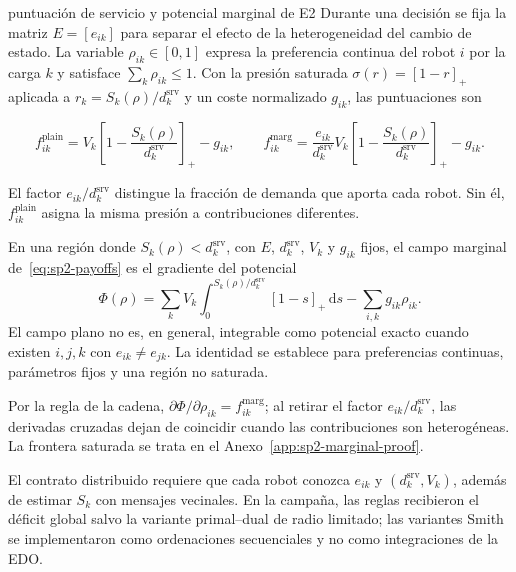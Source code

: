 \begin{contribucion}{puntuación de servicio y potencial marginal de E2}
Durante una decisión se fija la matriz $E=[e_{ik}]$ para separar el efecto de la heterogeneidad del cambio de estado. La variable $\rho_{ik}\in[0,1]$ expresa la preferencia continua del robot $i$ por la carga $k$ y satisface $\sum_k\rho_{ik}\leq1$. Con la presión saturada $\sigma(r)=[1-r]_+$ aplicada a $r_k=S_k(\rho)/d_k^{\mathrm{srv}}$ y un coste normalizado $g_{ik}$, las puntuaciones son

\begin{equation}
\label{eq:sp2-payoffs}
  f_{ik}^{\mathrm{plain}}
  =V_k\left[1-\frac{S_k(\rho)}{d_k^{\mathrm{srv}}}\right]_+-g_{ik},
  \qquad
  f_{ik}^{\mathrm{marg}}
  =\frac{e_{ik}}{d_k^{\mathrm{srv}}}V_k\left[1-\frac{S_k(\rho)}{d_k^{\mathrm{srv}}}\right]_+-g_{ik}.
\end{equation}

El factor $e_{ik}/d_k^{\mathrm{srv}}$ distingue la fracción de demanda que aporta cada robot. Sin él, $f_{ik}^{\mathrm{plain}}$ asigna la misma presión a contribuciones diferentes.

\begin{proposicion}
\label{prop:sp2-marginal-alignment-detail}
En una región donde $S_k(\rho)<d_k^{\mathrm{srv}}$, con $E$, $d_k^{\mathrm{srv}}$, $V_k$ y $g_{ik}$ fijos, el campo marginal de~\eqref{eq:sp2-payoffs} es el gradiente del potencial
\begin{equation}
\label{eq:sp2-potential}
  \Phi(\rho)=
  \sum_k V_k\int_0^{S_k(\rho)/d_k^{\mathrm{srv}}}[1-s]_+\,\mathrm ds
  -\sum_{i,k}g_{ik}\rho_{ik}.
\end{equation}
El campo plano no es, en general, integrable como potencial exacto cuando existen $i,j,k$ con $e_{ik}\neq e_{jk}$. La identidad se establece para preferencias continuas, parámetros fijos y una región no saturada.
\end{proposicion}
\end{contribucion}

Por la regla de la cadena, $\partial\Phi/\partial\rho_{ik}=f_{ik}^{\mathrm{marg}}$; al retirar el factor $e_{ik}/d_k^{\mathrm{srv}}$, las derivadas cruzadas dejan de coincidir cuando las contribuciones son heterogéneas. La frontera saturada se trata en el Anexo~\ref{app:sp2-marginal-proof}.

El contrato distribuido requiere que cada robot conozca $e_{ik}$ y $(d_k^{\mathrm{srv}},V_k)$, además de estimar $S_k$ con mensajes vecinales. En la campaña, las reglas recibieron el déficit global salvo la variante primal--dual de radio limitado; las variantes Smith se implementaron como ordenaciones secuenciales y no como integraciones de la EDO.


